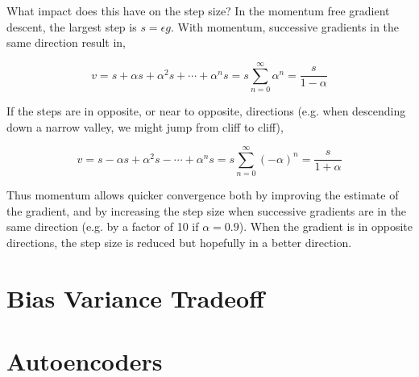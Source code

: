 \documentclass{article}
\begin{document}
What impact does this have on the step size? In the momentum free gradient descent, the largest step is $s = \epsilon g$. With momentum, successive gradients in the same direction result in,

\begin{equation}
    v = s + \alpha s + \alpha^2 s + \cdots + \alpha^n s = s \sum_{n=0}^{\infty} \alpha^n = \frac{s}{1 - \alpha}
\end{equation}

If the steps are in opposite, or near to opposite, directions (e.g. when descending down a narrow valley, we might jump from cliff to cliff),

\begin{equation}
    v = s - \alpha s + \alpha^2 s - \cdots{} + \alpha^n s = s \sum_{n=0}^{\infty} (-\alpha)^n = \frac{s}{1 + \alpha}
\end{equation}

\noindent
Thus momentum allows quicker convergence both by improving the estimate of the gradient, and by increasing the step size when successive gradients are in the same direction (e.g. by a factor of 10 if $\alpha = 0.9$). When the gradient is in opposite directions, the step size is reduced but hopefully in a better direction.


\section{Bias Variance Tradeoff}



\section{Autoencoders}



\end{document}
